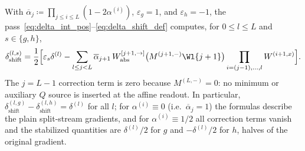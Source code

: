 \begin{theoremenv}\label{thm:closed_formula_shift}
With $\overline{\alpha}_j\coloneqq\prod_{j\le i\le L}(1-2\alpha^{(i)})$, $\varepsilon_g=1$, and $\varepsilon_h=-1$, the pass~\eqref{eq:delta_int_pos}--\eqref{eq:delta_shift_def} computes, for $0\le l\le L$ and $s\in\{g,h\}$,
\begin{equation}
\delta_{\mathrm{shift}}^{(l,s)}
=\frac12\Bigl[\varepsilon_s\delta^{(l)}-\sum_{l\le j<L}\overline{\alpha}_{j+1}\,W_{\mathrm{abs}}^{[j+1,\rightarrow]}\bigl(M^{(j+1,-)}\Wl{j+1}\bigr)\prod_{i=(j-1),\dots,l}W^{(i+1,x)}\Bigr].
\label{eq:closed_formula_g}
\end{equation}
The $j=L-1$ correction term is zero because $M^{(L,-)}=0$: no minimum or auxiliary $Q$ source is inserted at the affine readout. In particular, $\delta_{\mathrm{shift}}^{(l,g)} - \delta_{\mathrm{shift}}^{(l,h)} = \delta^{(l)}$ for all $l$; for $\alpha^{(i)} \equiv 0$ (i.e.\ $\overline{\alpha}_j = 1$) the formulas describe the plain split-stream gradients, and for $\alpha^{(i)} \equiv 1/2$ all correction terms vanish and the stabilized quantities are $\delta^{(l)}/2$ for $g$ and $-\delta^{(l)}/2$ for $h$, halves of the original gradient.\end{theoremenv}

